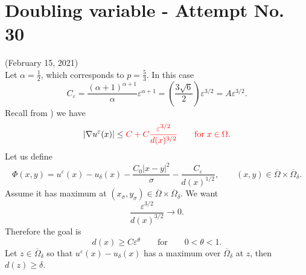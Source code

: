 \documentclass[11pt,reqno]{amsart}
\numberwithin{figure}{section}
\theoremstyle{plain}
\theoremstyle{remark}
\numberwithin{equation}{section}
\begin{document}
\section{Doubling variable - Attempt No. 30}
\noindent (February 15, 2021) \\
Let $\alpha = \frac{1}{2}$, which corresponds to $p = \frac{5}{3}$. In this case
\begin{equation*}
    C_\varepsilon = \frac{(\alpha+1)^{\alpha+1}}{\alpha}\varepsilon^{\alpha+1} = \left(\frac{3\sqrt{6}}{2}\right)\varepsilon^{3/2} = A\varepsilon^{3/2}.
\end{equation*}
Recall from \cite{alessio_asymptotic_2006}) we have
\begin{equation*}
|\nabla u^\varepsilon(x)|  \leq \color{red}{C}+  C\frac{\varepsilon^{3/2}}{d(x)^{3/2}} \qquad\text{for}\;x\in \Omega.
\end{equation*}
Let us define
\begin{equation*}
    \Phi(x,y) = u^\varepsilon(x) - u_\delta(x) -\frac{C_0|x-y|^2}{\sigma} - \frac{C_\varepsilon}{d(x)^{1/2}}, \qquad (x,y)\in \overline{\Omega}\times \overline{\Omega}_\delta.
\end{equation*}
Assume it has maximum at $(x_\sigma,y_\sigma)\in \overline{\Omega}\times \overline{\Omega}_\delta$. We want
\begin{equation*}
    \frac{\varepsilon^{3/2}}{d(x)^{3/2}} \rightarrow 0.
\end{equation*}
Therefore the goal is
\begin{equation*}
    d(x)\geq C\varepsilon^\theta \qquad\text{for} \qquad 0<\theta < 1.
\end{equation*}
Let $z\in \overline{\Omega}_\delta$ so that $u^\varepsilon(x) - u_\delta(x)$ has a maximum over $\overline{\Omega}_\delta$ at $z$, then $d(z)\geq \delta$. \\
\end{document}
